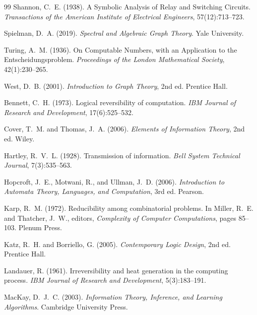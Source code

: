 \documentclass[12pt, a4paper]{article}
\theoremstyle{definition}
\theoremstyle{remark}
\begin{document}
\begin{thebibliography}{99}
Shannon, C.~E. (1938).
\newblock A Symbolic Analysis of Relay and Switching Circuits.
\newblock \textit{Transactions of the American Institute of Electrical Engineers}, 57(12):713--723.

Spielman, D.~A. (2019).
\newblock \textit{Spectral and Algebraic Graph Theory}.
\newblock Yale University.

Turing, A.~M. (1936).
\newblock On Computable Numbers, with an Application to the Entscheidungsproblem.
\newblock \textit{Proceedings of the London Mathematical Society}, 42(1):230--265.

West, D.~B. (2001).
\newblock \textit{Introduction to Graph Theory}, 2nd ed.
\newblock Prentice Hall.

Bennett, C.~H. (1973).
\newblock Logical reversibility of computation.
\newblock \textit{IBM Journal of Research and Development}, 17(6):525--532.

Cover, T.~M. and Thomas, J.~A. (2006).
\newblock \textit{Elements of Information Theory}, 2nd ed.
\newblock Wiley.

Hartley, R.~V.~L. (1928).
\newblock Transmission of information.
\newblock \textit{Bell System Technical Journal}, 7(3):535--563.

Hopcroft, J.~E., Motwani, R., and Ullman, J.~D. (2006).
\newblock \textit{Introduction to Automata Theory, Languages, and Computation}, 3rd ed.
\newblock Pearson.

Karp, R.~M. (1972).
\newblock Reducibility among combinatorial problems.
\newblock In Miller, R.~E. and Thatcher, J.~W., editors, \textit{Complexity of Computer Computations}, pages 85--103. Plenum Press.

Katz, R.~H. and Borriello, G. (2005).
\newblock \textit{Contemporary Logic Design}, 2nd ed.
\newblock Prentice Hall.

Landauer, R. (1961).
\newblock Irreversibility and heat generation in the computing process.
\newblock \textit{IBM Journal of Research and Development}, 5(3):183--191.

MacKay, D.~J.~C. (2003).
\newblock \textit{Information Theory, Inference, and Learning Algorithms}.
\newblock Cambridge University Press.


\end{thebibliography}
\end{document}
